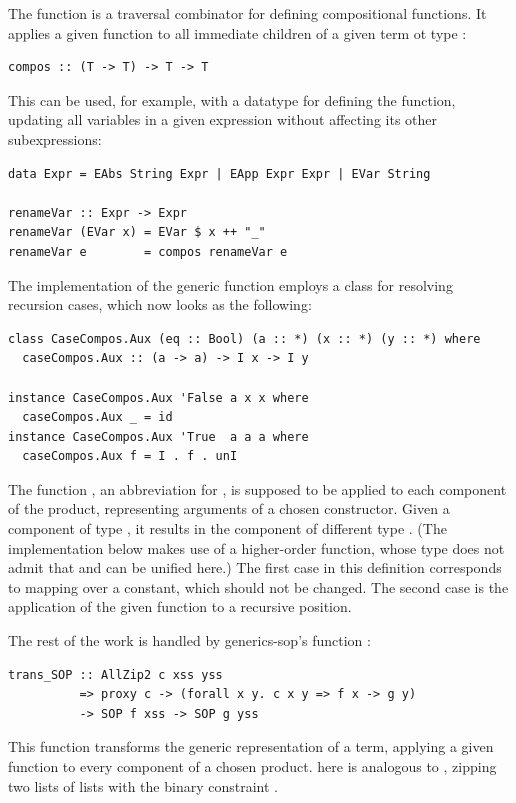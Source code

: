 \documentclass[sigplan,screen,review,anonymous]{acmart}
\begin{document}
The function  is a traversal combinator for defining compositional functions. It applies a given function to all immediate children of a given term ot type :
\begin{lstlisting}[style=fancy]
compos :: (T -> T) -> T -> T
\end{lstlisting}
This can be used, for example, with a datatype  for defining the  function, updating all variables in a given expression without affecting its other subexpressions:
\begin{lstlisting}[style=fancy]
data Expr = EAbs String Expr | EApp Expr Expr | EVar String

renameVar :: Expr -> Expr
renameVar (EVar x) = EVar $ x ++ "_"
renameVar e        = compos renameVar e
\end{lstlisting}

The implementation of the generic function  employs a class for resolving recursion cases, which now looks as the following:
\begin{lstlisting}[style=fancy]
class CaseCompos.Aux (eq :: Bool) (a :: *) (x :: *) (y :: *) where
  caseCompos.Aux :: (a -> a) -> I x -> I y

instance CaseCompos.Aux 'False a x x where
  caseCompos.Aux _ = id
instance CaseCompos.Aux 'True  a a a where
  caseCompos.Aux f = I . f . unI
\end{lstlisting}
The function , an abbreviation for , is supposed to be applied to each component of the product, representing arguments of a chosen constructor. Given a component of type , it results in the component of different type . (The implementation below makes use of a higher-order function, whose type does not admit that  and  can be unified here.) The first case in this definition corresponds to mapping over a constant, which should not be changed. The second case is the application of the given function  to a recursive position.

The rest of the work is handled by \textsf{generics-sop}'s function :
\begin{lstlisting}[style=fancy]
trans_SOP :: AllZip2 c xss yss
          => proxy c -> (forall x y. c x y => f x -> g y)
          -> SOP f xss -> SOP g yss
\end{lstlisting}
This function transforms the generic representation of a term, applying a given function to every component of a chosen product.  here is analogous to , zipping two lists of lists with the binary constraint .
\end{document}
